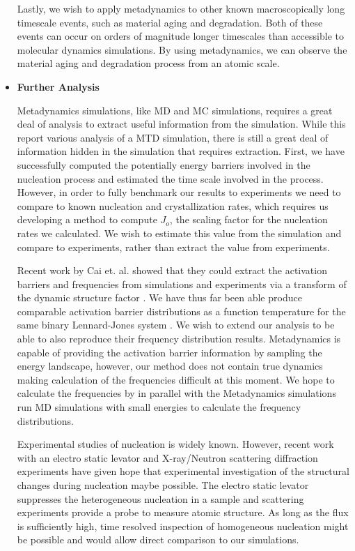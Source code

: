 \begin{itemize}
	Lastly, we wish to apply metadynamics to other known macroscopically long timescale events, such as material aging and  degradation.  Both of these events can occur on orders of magnitude longer timescales than accessible to molecular dynamics simulations.  By using metadynamics, we can observe the material aging and degradation process from an atomic scale.  
	
	\item \textbf{Further Analysis}
	
	Metadynamics simulations, like MD and MC simulations, requires a great deal of analysis to extract useful information from the simulation.  While this report various analysis of a MTD simulation, there is still a great deal of information hidden in the simulation that requires extraction.  First, we have successfully computed the potentially energy barriers involved in the nucleation process and estimated the time scale involved in the process.  However, in order to fully benchmark our results to experiments we need to compare to known nucleation and crystallization rates, which requires us developing a method to compute $J_o$, the scaling factor for the nucleation rates we calculated.  We wish to estimate this value from the simulation and compare to experiments, rather than extract the value from experiments.
	
	Recent work by Cai et. al. showed that they could extract the activation barriers and frequencies from simulations and experiments via a transform of the dynamic structure factor \cite{CaiREMA}.  We have thus far been able produce comparable activation barrier distributions as a function temperature for the same binary Lennard-Jones system \cite{CaiRMA}.  We wish to extend our analysis to be able to also reproduce their frequency distribution results.  Metadynamics is capable of providing the activation barrier information by sampling the energy landscape, however, our method does not contain true dynamics making calculation of the frequencies difficult at this moment.  We hope to calculate the frequencies by in parallel with the Metadynamics simulations run MD simulations with small energies to calculate the frequency distributions.
	
	Experimental studies of nucleation is widely known.  However, recent work with an electro static levator and X-ray/Neutron scattering diffraction experiments have given hope that experimental investigation of the structural changes during nucleation maybe possible.  The electro static levator suppresses the heterogeneous nucleation in a sample and scattering experiments provide a probe to measure atomic structure.  As long as the flux is sufficiently high, time resolved inspection of homogeneous nucleation might be possible and would allow direct comparison to our simulations.
	

\end{itemize}
